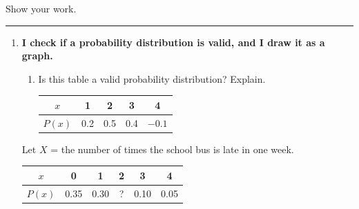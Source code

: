 \documentclass[11pt]{article}
\newcommand{\lessonhead}[1]{\par\vspace{0.6em}{\large\bfseries #1}\par\vspace{0.25em}\hrule\vspace{0.6em}}
\newcommand{\goal}[1]{\textbf{#1}\par\vspace{0.35em}}
\begin{document}

Show your work.

\lessonhead{7.1 - Probability Distributions}
\begin{enumerate}

\item \goal{I check if a probability distribution is valid, and I draw it as a graph.}
\begin{enumerate}
  \item Is this table a valid probability distribution? Explain.

  \vspace{0.3em}
  \begin{minipage}[t]{0.38\linewidth}\vspace{0pt}
  \renewcommand{\arraystretch}{1.4}
  \begin{tabular}{|c|c|c|c|c|}\hline $x$ & 1 & 2 & 3 & 4\\ \hline $P(x)$ & 0.2 & 0.5 & 0.4 & $-0.1$\\ \hline\end{tabular}
  \end{minipage}\hfill
  \begin{minipage}[t][3.4em][t]{0.6\linewidth}\vspace{0pt}\raggedright
  \end{minipage}
\end{enumerate}

\vspace{0.4em}
\begin{minipage}[t]{0.5\linewidth}\vspace{0pt}\raggedright
Let $X$ = the number of times the school bus is late in one week.
\end{minipage}\hfill
\begin{minipage}[t]{0.46\linewidth}\vspace{0pt}\raggedleft
\renewcommand{\arraystretch}{1.4}
\begin{tabular}{|c|c|c|c|c|c|}\hline
$x$ & 0 & 1 & 2 & 3 & 4\\ \hline
$P(x)$ & 0.35 & 0.30 & \;?\; & 0.10 & 0.05\\ \hline
\end{tabular}
\end{minipage}


\end{enumerate}
\end{document}
